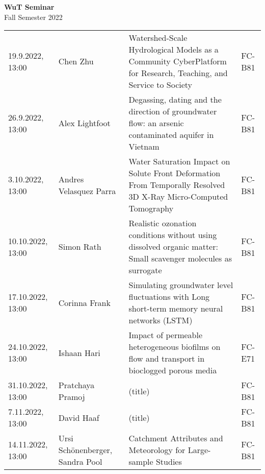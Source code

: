 \documentclass[12pt]{article}
\begin{document}
\centering

{\Huge \bf WuT Seminar}\\[1cm]
{\Large Fall Semester 2022}\\[1.8cm]





\renewcommand*\arraystretch{1.4}
\begin{tabular}{l p{3.8cm} p{8.5cm} p{2cm}}

19.9.2022, 13:00
 	& Chen Zhu
 	& Watershed-Scale Hydrological Models as a Community CyberPlatform for Research, Teaching, and Service to Society
  & FC-B81\\
  
26.9.2022, 13:00
 	& Alex Lightfoot
 	& Degassing, dating and the direction of groundwater flow: an arsenic contaminated aquifer in Vietnam
 	& FC-B81\\

3.10.2022, 13:00
 	& Andres Velasquez Parra
 	& Water Saturation Impact on Solute Front Deformation From Temporally Resolved 3D X-Ray Micro-Computed Tomography
 	& FC-B81\\

10.10.2022, 13:00
 	& Simon Rath
 	& Realistic ozonation conditions without using dissolved organic matter: Small scavenger molecules as surrogate
 	& FC-B81\\

17.10.2022, 13:00
 	& Corinna Frank
 	& Simulating groundwater level fluctuations with Long short-term memory neural networks (LSTM)
 	& FC-B81\\
 	
24.10.2022, 13:00
 	& Ishaan Hari
 	& Impact of permeable heterogeneous biofilms on flow and transport in bioclogged porous media
 	& FC-E71\\

31.10.2022, 13:00
 	& Pratchaya Pramoj
 	& (title)
 	& FC-B81\\

7.11.2022, 13:00
 	& David Haaf
 	& (title)
 	& FC-B81\\

14.11.2022, 13:00
 	& Ursi Schönenberger, Sandra Pool
 	& Catchment Attributes and Meteorology for Large-sample Studies
 	& FC-B81\\


\end{tabular}
\end{document}
